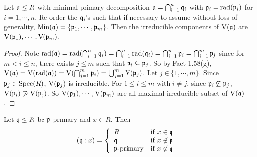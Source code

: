 \begin{proposition}
    Let $\mathfrak{a} \lneq R$ with minimal primary decomposition $\mathfrak{a} = \bigcap_{i=1}^{n} \mathfrak{q}_i$ with $\mathfrak{p}_i = \operatorname{rad}(\mathfrak{p}_i)$ for $i = 1,\cdots,n$. Re-order the $\mathfrak{q}_i$'s such that if necessary to assume without loss of generality, $\operatorname{Min}(\mathfrak{a}) = \{\mathfrak{p}_1,\cdots,\mathfrak{p}_m\}$. Then the irreducible components of $\operatorname{V}(\mathfrak{a})$ are $\operatorname{V}(\mathfrak{p}_1),\cdots,\operatorname{V}(\mathfrak{p}_m)$.
\end{proposition}

\begin{proof}
    Note $\operatorname{rad}(\mathfrak{a}) = \operatorname{rad}(\bigcap_{i=1}^{n}\mathfrak{q}_i) = \bigcap_{i=1}^{n} \operatorname{rad}(\mathfrak{q}_i) = \bigcap_{i=1}^{n} \mathfrak{p}_i = \bigcap_{i=1}^{m} \mathfrak{p}_j$ since for $m < i \leq n$, there exists $j \leq m$ such that $\mathfrak{p}_i \subseteq \mathfrak{p}_j$. So by Fact 1.58(g), $\operatorname{V}(\mathfrak{a}) = \operatorname{V}(\operatorname{rad}(\mathfrak{a})) = \operatorname{V}(\bigcap_{j=1}^{m}\mathfrak{p}_i) = \bigcup_{j=1}^{m} \operatorname{V}(\mathfrak{p}_j)$. Let $j \in \{1,\cdots,m\}$. Since $\mathfrak{p}_j \in \operatorname{Spec}(R)$, $\operatorname{V}(\mathfrak{p}_j)$ is irreducible. For $1 \leq i \leq m$ with $i \neq j$, since $\mathfrak{p}_i \not\subseteq \mathfrak{p}_j$, $\operatorname{V}(\mathfrak{p}_i) \not\supseteq \operatorname{V}(\mathfrak{p}_j)$. So $\operatorname{V}(\mathfrak{p}_1),\cdots,\operatorname{V}(\mathfrak{p}_m)$ are all maximal irreducible subset of $\operatorname{V}(\mathfrak{a})$. 
\end{proof}

\begin{proposition}
    Let $\mathfrak{q} \lneq R$ be $\mathfrak{p}$-primary and $x \in R$. Then 
    \[
        (\mathfrak{q}:x) = \left\{
            \begin{array}{ll}
                R &\text{if }x \in \mathfrak{q} \\
                \mathfrak{q} &\text{if }x \not \in \mathfrak{p} \\
                \mathfrak{p}\text{-primary} &\text{if }x \not \in \mathfrak{q} \\
            \end{array}
        \right..
    \]
\end{proposition}

